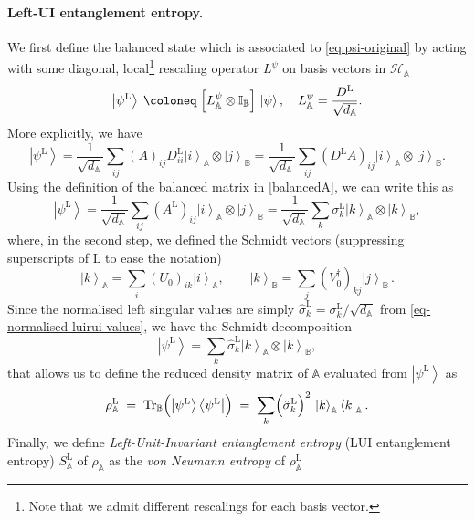 \documentclass[11pt,a4paper]{article}
\newcommand{\be}{\begin{equation}}
\newcommand{\ee}{\end{equation}}
\newcommand{\ket}[1]{\left|#1\right\rangle}
\newcommand{\bra}[1]{\left\langle#1\right|}
\begin{document}
\paragraph{Left-UI entanglement entropy.} We first define the balanced state which is associated to \cref{eq:psi-original} by acting with some diagonal, local\footnote{Note that we admit different rescalings for each basis vector.} rescaling operator $L^\psi$ on basis vectors in $\mathcal{H}_\mathbb{A}$
\begin{equation}
 \ket{\psi^\mathrm{L}} \;\coloneq \; \Bigl[L^{\psi}_\mathbb{A}\otimes \mathbb I_\mathbb{B}\Bigr]\,\ket{\psi}, \quad L^\psi_\mathbb{A} = \frac{D^\mathrm{L}}{\sqrt{d_\mathbb{A}}}.
 \label{eq:balanced-left}
\end{equation}
More explicitly, we have
\be
\ket{\psi^{\mathrm L}}=\frac{1}{\sqrt{d_\mathbb{A}}}\sum_{ij}(A)_{ij}D^{\mathrm L}_{ii}\ket{i}_\mathbb{A}\otimes \ket{j}_\mathbb{B}= \frac{1}{\sqrt{d_\mathbb{A}}}\sum_{ij}(D^{\mathrm L}A)_{ij}\ket{i}_\mathbb{A}\otimes \ket{j}_\mathbb{B}.
\ee
Using the definition of the balanced matrix in \cref{balancedA}, we can write this as
\be
\ket{\psi^{\mathrm L}}=\frac{1}{\sqrt{d_\mathbb{A}}}\sum_{ij}(A^{\mathrm L})_{ij}\ket{i}_\mathbb{A}\otimes \ket{j}_\mathbb{B}= \frac{1}{\sqrt{d_\mathbb{A}}}\sum_{k}\sigma^{\mathrm L}_k\ket{k}_\mathbb{A}\otimes \ket{k}_\mathbb{B},
\ee
where, in the second step, we defined the Schmidt vectors (suppressing superscripts of $\mathrm L$ to ease the notation)
\be
\ket{k}_\mathbb{A}=\sum_i (U_0)_{ik}\ket{i}_\mathbb{A},\qquad \ket{k}_\mathbb{B}=\sum_j(V^\dagger_0)_{kj}\ket{j}_\mathbb{B}\,.
\ee
Since the normalised left singular values are simply $\hat{\sigma}^{\mathrm L}_k=\sigma^{\mathrm L}_k/\sqrt{d_\mathbb{A}}$ from \cref{eq-normalised-luirui-values}, we have the Schmidt decomposition 
\be
\ket{\psi^{\mathrm L}}=\sum_{k}\hat{\sigma}^{\mathrm L}_k\ket{k}_\mathbb{A}\otimes \ket{k}_\mathbb{B}, \label{SchDLeft}
\ee
that allows us to define the reduced density matrix of $\mathbb{A}$ evaluated from $\ket{\psi^{\mathrm L}}$ as
\begin{equation}
 \rho^{\mathrm L}_\mathbb{A} \;=\; \mathrm{Tr}_\mathbb{B}\Bigl(\ket{\psi^\mathrm{L}}\bra{\psi^\mathrm{L}}\Bigr)
 \;=\; \sum_{k} \Bigl(\hat{\sigma}_k^\mathrm{L}\Bigr)^2\, \ket{k}_\mathbb{A}\bra{k}_\mathbb{A}.
 \label{eq:rhoA-left}
\end{equation}
Finally, we define \textit{Left-Unit-Invariant entanglement entropy} (LUI entanglement entropy) \(S^{\mathrm{L}}_\mathbb{A}\) of $\rho_\mathbb{A}$ as the \textit{von Neumann entropy} of $\rho^{\mathrm L}_\mathbb{A}$ 
\end{document}
